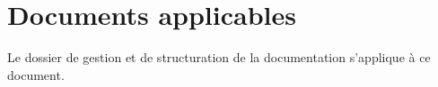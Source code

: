 \section{Documents applicables}

Le dossier de gestion et de structuration de la documentation s'applique à ce 
document.
